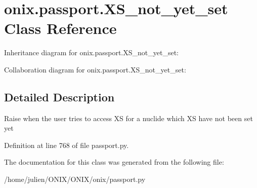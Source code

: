 \hypertarget{classonix_1_1passport_1_1XS__not__yet__set}{}\section{onix.\+passport.\+X\+S\+\_\+not\+\_\+yet\+\_\+set Class Reference}
\label{classonix_1_1passport_1_1XS__not__yet__set}


Inheritance diagram for onix.\+passport.\+X\+S\+\_\+not\+\_\+yet\+\_\+set\+:


Collaboration diagram for onix.\+passport.\+X\+S\+\_\+not\+\_\+yet\+\_\+set\+:


\subsection{Detailed Description}
\begin{DoxyVerb}Raise when the user tries to access XS for a nuclide which XS have not been set yet \end{DoxyVerb}
 

Definition at line 768 of file passport.\+py.



The documentation for this class was generated from the following file\+:\begin{DoxyCompactItemize}
\item 
/home/julien/\+O\+N\+I\+X/\+O\+N\+I\+X/onix/passport.\+py\end{DoxyCompactItemize}

